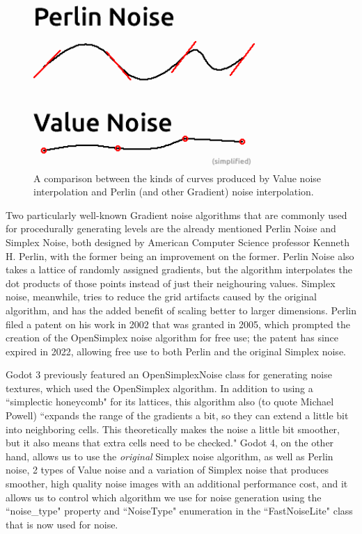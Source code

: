 \begin{figure}[H]
    \centering
    \includegraphics[width=0.75\textwidth]{Images/valueperlincomparison.png}
    \caption{A comparison between the kinds of curves produced by Value noise interpolation and Perlin (and other Gradient) noise interpolation.\cite{perlinvalue}}
    \label{fig:valueperlincomparison}
\end{figure}

Two particularly well-known Gradient noise algorithms that are commonly used for procedurally generating levels are the already mentioned Perlin Noise and Simplex Noise, both designed by American Computer Science professor Kenneth H. Perlin, with the former being an improvement on the former. Perlin Noise also takes a lattice of randomly assigned gradients, but the algorithm interpolates the dot products of those points instead of just their neighouring values.\cite{fastnoiselitedocs} Simplex noise, meanwhile, tries to reduce the grid artifacts caused by the original algorithm, and has the added benefit of scaling better to larger dimensions.\cite{pcgwikisimplex} Perlin filed a patent on his work in 2002 that was granted in 2005\cite{perlinpatent}, which prompted the creation of the OpenSimplex noise algorithm\cite{opensimplex}\cite{simplexarticle1}\cite{simplexarticle2} for free use; the patent has since expired in 2022, allowing free use to both Perlin and the original Simplex noise.\cite{perlinpatent}

Godot 3 previously featured an OpenSimplexNoise class\cite{opensimplexdocs}\cite{gdblogsimplex} for generating noise textures, which used the OpenSimplex algorithm. In addition to using a ``simplectic honeycomb" for its lattices\cite{simplexarticle2}, this algorithm also  (to quote Michael Powell) ``expands the range of the gradients a bit, so they can extend a little bit into neighboring cells. This theoretically makes the noise a little bit smoother, but it also means that extra cells need to be checked."\cite{simplexarticle1} Godot 4, on the other hand, allows us to use the \textit{original} Simplex noise algorithm, as well as Perlin noise, 2 types of Value noise and a variation of Simplex noise that produces smoother, high quality noise images with an additional performance cost, and it allows us to control which algorithm we use for noise generation using the ``noise\_type" property and ``NoiseType" enumeration in the ``FastNoiseLite" class that is now used for noise.\cite{fastnoiselitedocs} 

